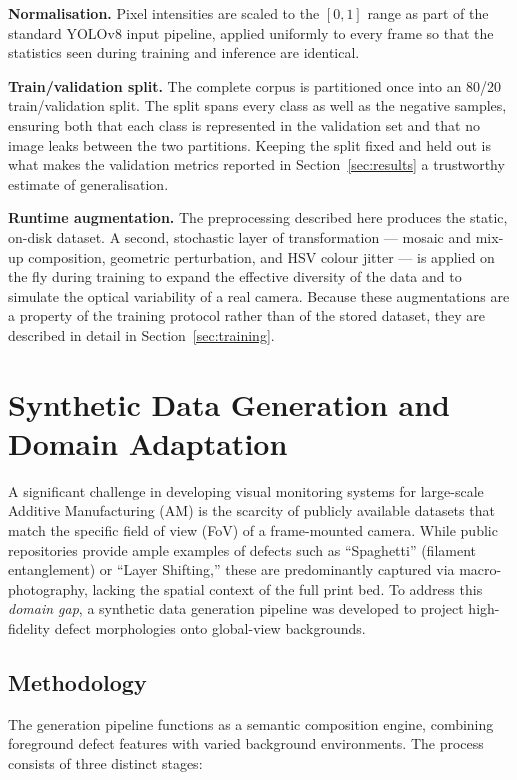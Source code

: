 \documentclass[english, Lau, oneside]{sapthesis}
\begin{document}
\textbf{Normalisation.} Pixel intensities are scaled to the $[0,1]$ range as part of the standard YOLOv8 input pipeline, applied uniformly to every frame so that the statistics seen during training and inference are identical.

\textbf{Train/validation split.} The complete corpus is partitioned once into an 80/20 train/validation split. The split spans every class as well as the negative samples, ensuring both that each class is represented in the validation set and that no image leaks between the two partitions. Keeping the split fixed and held out is what makes the validation metrics reported in Section~\ref{sec:results} a trustworthy estimate of generalisation.

\textbf{Runtime augmentation.} The preprocessing described here produces the static, on-disk dataset. A second, stochastic layer of transformation --- mosaic and mix-up composition, geometric perturbation, and HSV colour jitter --- is applied on the fly during training to expand the effective diversity of the data and to simulate the optical variability of a real camera. Because these augmentations are a property of the training protocol rather than of the stored dataset, they are described in detail in Section~\ref{sec:training}.

\section{Synthetic Data Generation and Domain Adaptation}
\label{sec:synthetic_data}

A significant challenge in developing visual monitoring systems for large-scale Additive Manufacturing (AM) is the scarcity of publicly available datasets that match the specific field of view (FoV) of a frame-mounted camera. While public repositories provide ample examples of defects such as ``Spaghetti'' (filament entanglement) or ``Layer Shifting,'' these are predominantly captured via macro-photography, lacking the spatial context of the full print bed. To address this \textit{domain gap}, a synthetic data generation pipeline was developed to project high-fidelity defect morphologies onto global-view backgrounds.

\subsection{Methodology}
The generation pipeline functions as a semantic composition engine, combining foreground defect features with varied background environments. The process consists of three distinct stages:
\end{document}
